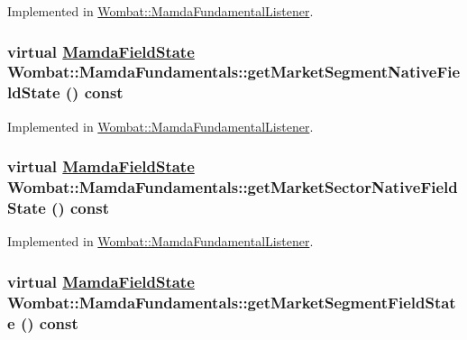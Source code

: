 Implemented in \hyperlink{classWombat_1_1MamdaFundamentalListener_e2ef62938cccc0dfd0248b42f8666314}{Wombat::Mamda\-Fundamental\-Listener}.\hypertarget{classWombat_1_1MamdaFundamentals_051e9a92d80a41fadf421c094b996b4c}{
\subsubsection[getMarketSegmentNativeFieldState]{\setlength{\rightskip}{0pt plus 5cm}virtual \hyperlink{namespaceWombat_93aac974f2ab713554fd12a1fa3b7d2a}{Mamda\-Field\-State} Wombat::Mamda\-Fundamentals::get\-Market\-Segment\-Native\-Field\-State () const}}
\label{classWombat_1_1MamdaFundamentals_051e9a92d80a41fadf421c094b996b4c}




Implemented in \hyperlink{classWombat_1_1MamdaFundamentalListener_178e08697638bdf25d54e276ec416119}{Wombat::Mamda\-Fundamental\-Listener}.\hypertarget{classWombat_1_1MamdaFundamentals_4baa69aa9248171d05776310b583db7e}{
\subsubsection[getMarketSectorNativeFieldState]{\setlength{\rightskip}{0pt plus 5cm}virtual \hyperlink{namespaceWombat_93aac974f2ab713554fd12a1fa3b7d2a}{Mamda\-Field\-State} Wombat::Mamda\-Fundamentals::get\-Market\-Sector\-Native\-Field\-State () const}}
\label{classWombat_1_1MamdaFundamentals_4baa69aa9248171d05776310b583db7e}




Implemented in \hyperlink{classWombat_1_1MamdaFundamentalListener_7c42cf22f6a4e6167f365df4cdad2c6c}{Wombat::Mamda\-Fundamental\-Listener}.\hypertarget{classWombat_1_1MamdaFundamentals_d80a02902e1682818f3030af747e68ad}{
\subsubsection[getMarketSegmentFieldState]{\setlength{\rightskip}{0pt plus 5cm}virtual \hyperlink{namespaceWombat_93aac974f2ab713554fd12a1fa3b7d2a}{Mamda\-Field\-State} Wombat::Mamda\-Fundamentals::get\-Market\-Segment\-Field\-State () const}}
\label{classWombat_1_1MamdaFundamentals_d80a02902e1682818f3030af747e68ad}




